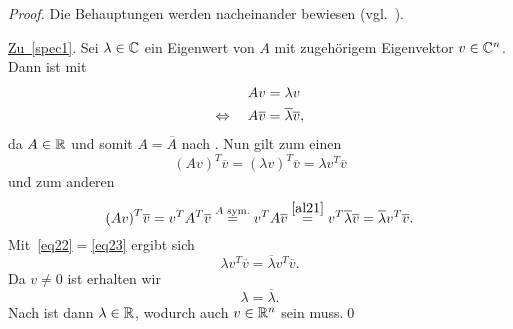 \begin{proof}
    Die Behauptungen werden nacheinander bewiesen (vgl.~\cite{proof:SpectralTom}).

    \vspace{5pt}
    \underline{Zu~\ref{spec1}}. Sei \(\lambda \in \mathbb{C}\) ein Eigenwert von \(A\) mit zugehörigem Eigenvektor \(v \in \mathbb{C}^{n}\). 
    Dann ist mit 
    \begin{align}
        Av &=\lambda v \notag \label{al21}\\
        \Leftrightarrow \quad A\overline{v} &= \overline{\lambda}\overline{v},
    \end{align}
    da \(A \in \mathbb{R}\) und somit \(A=\overline{A}\) nach . 
    Nun gilt zum einen
    \begin{equation}
        {\left(Av\right)}^T \overline{v} = {\left(\lambda v\right)}^{T} \overline{v} = \lambda {v}^{T} \overline{v} \label{eq22}
    \end{equation}
    und zum anderen
    \begin{equation}
        {\left(Av\right)}^T \overline{v} = v^{T}A^{T}\overline{v} \overset{A\text{ sym.}}{=} v^{T}A\overline{v} \overset{\eqref{al21}}{=} v^{T}\overline{\lambda}\overline{v} = \overline{\lambda}v^{T}\overline{v}. \label{eq23}
    \end{equation}
    Mit~\eqref{eq22}\(=\)\eqref{eq23} ergibt sich
    \begin{equation*}
        \lambda v^{T}\overline{v} = \overline{\lambda}v^{T}\overline{v} .
    \end{equation*}
    Da \(v \neq 0\) ist erhalten wir
    \begin{equation*}
        \lambda = \overline{\lambda}.
    \end{equation*}
    Nach  ist dann \(\lambda \in \mathbb{R}\), wodurch auch \(v \in \mathbb{R}^{n}\) sein muss.\qed
    \vspace{5pt} 


\end{proof}
